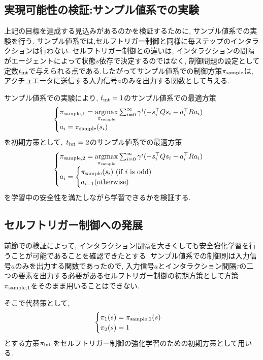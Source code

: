 \documentclass{jsarticle}
\newcommand{\argmax}{\mathop{\rm argmax}\limits}
\begin{document}
\subsection{実現可能性の検証:サンプル値系での実験}
上記の目標を達成する見込みがあるのかを検証するために, サンプル値系での実験を行う. サンプル値系では,セルフトリガー制御と同様に毎ステップのインタラクションは行わない. セルフトリガー制御との違いは, インタラクションの間隔がエージェントによって状態$s$依存で決定するのではなく, 制御問題の設定として定数$t_{\rm{int}}$で与えられる点である.したがってサンプル値系での制御方策$\pi_{\rm{sample}}$は,アクチュエータに送信する入力信号$a$のみを出力する関数として与える.\par
サンプル値系での実験により, $t_{\rm{int}}=1$のサンプル値系での最適方策
\begin{align}
\begin{cases}
	\pi_{\rm{sample},1} = \argmax_{\pi_{\rm{sample}}} \sum_{i=0}^{\infty} \gamma^i(-s_i^{\top}Qs_i-a_i^{\top}Ra_i) \\
	a_i  = \pi_{\rm{sample}}(s_i)
\end{cases}
\end{align}
を初期方策として,~$t_{\rm{int}}=2$のサンプル値系での最適方策
\begin{align}
\begin{cases}
	\pi_{\rm{sample},2} = \argmax_{\pi_{\rm{sample}}} \sum_{i=0}^{\infty} \gamma^i(-s_i^{\top}Qs_i-a_i^{\top}Ra_i) \\
	a_i  = \begin{cases}
			\pi_{\rm{sample}}(s_i)~(\textrm{if \textit{i} is odd})\\ a_{i-1} (\textrm{otherwise})
		\end{cases}
\end{cases}
\end{align}
 を学習中の安全性を満たしながら学習できるかを検証する. 

\subsection{セルフトリガー制御への発展}
前節での検証によって, インタラクション間隔を大きくしても安全強化学習を行うことが可能であることを確認できたとする. サンプル値系での制御則は入力信号$a$のみを出力する関数であったので, 入力信号$a$とインタラクション間隔$\tau$の二つの要素を出力する必要があるセルフトリガー制御の初期方策として方策$\pi_{\rm{sample},1}$をそのまま用いることはできない. \par
そこで代替策として,
\begin{align}
\begin{cases}
	\pi_1(s)=\pi_{\rm{sample},1}(s)\\
	\pi_2(s)=1
\end{cases}
\end{align}
とする方策$\pi_{\rm{init}}$をセルフトリガー制御の強化学習のための初期方策として用いる.
\end{document}
